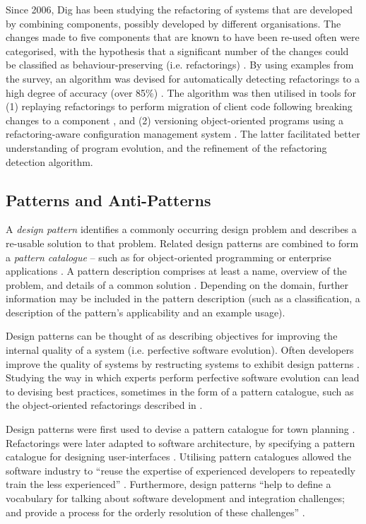Since 2006, Dig has been studying the refactoring of systems that are developed by combining components, possibly developed by different organisations. The \cc changes made to five components that are known to have been re-used often were categorised, with the hypothesis that a significant number of the changes could be classified as behaviour-preserving (i.e. refactorings) \cite{dig06apis}. By using examples from the survey, an algorithm was devised for automatically detecting refactorings to a high degree of accuracy (over 85\%) \cite{dig06detection}. The algorithm was then utilised in tools for (1) replaying refactorings to perform migration of client code following breaking changes to a component \cite{dig06automatic}, and (2) versioning object-oriented programs using a refactoring-aware configuration management system \cite{dig07cms}. The latter facilitated better understanding of program evolution, and the refinement of the refactoring detection algorithm.


\subsection{Patterns and Anti-Patterns}
\label{sec:LitReviewPatterns}
A \textit{design pattern} identifies a commonly occurring design problem and describes a re-usable solution to that problem. Related design patterns are combined to form a \textit{pattern catalogue} -- such as for object-oriented programming \cite{gamma95patterns} or enterprise applications \cite{fowler02patterns}. A pattern description comprises at least a name, overview of the problem, and details of a common solution \cite{brown98antipatterns}. Depending on the domain, further information may be included in the pattern description (such as a classification, a description of the pattern's applicability and an example usage).

Design patterns can be thought of as describing objectives for improving the internal quality of a system (i.e. perfective software evolution). Often developers improve the quality of systems by restructing systems to exhibit design patterns \cite{kerievsky04refactoring}. Studying the way in which experts perform perfective software evolution can lead to devising best practices, sometimes in the form of a pattern catalogue, such as the object-oriented refactorings described in \cite{fowler99refactoring}.

Design \cc patterns were first used to devise a pattern catalogue for town planning \cite{alexander77pattern}. Refactorings \cc were later adapted to software architecture, by specifying a pattern catalogue for designing user-interfaces \cite{beck89constructing}. Utilising pattern catalogues allowed the software industry to ``reuse the expertise of experienced developers to repeatedly train the less experienced'' \cite[pg. 10]{brown98antipatterns}. Furthermore, \cc design patterns ``help to define a vocabulary for talking about software development and integration challenges; and provide a process for the orderly resolution of these challenges'' \cite[pg. xii]{rising01designpatterns}. 

